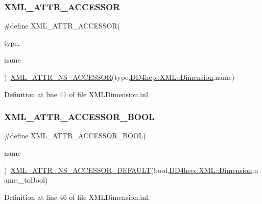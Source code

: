 \subsubsection{\texorpdfstring{X\+M\+L\+\_\+\+A\+T\+T\+R\+\_\+\+A\+C\+C\+E\+S\+S\+OR}{XML\_ATTR\_ACCESSOR}}
{\footnotesize\ttfamily \#define X\+M\+L\+\_\+\+A\+T\+T\+R\+\_\+\+A\+C\+C\+E\+S\+S\+OR(\begin{DoxyParamCaption}\item[{}]{type,  }\item[{}]{name }\end{DoxyParamCaption})~\hyperlink{_x_m_l_dimension_8inl_a712f343791889ac7912b917b64ccb32a}{X\+M\+L\+\_\+\+A\+T\+T\+R\+\_\+\+N\+S\+\_\+\+A\+C\+C\+E\+S\+S\+OR}(type,\hyperlink{struct_d_d4hep_1_1_x_m_l_1_1_dimension}{D\+D4hep\+::\+X\+M\+L\+::\+Dimension},name)}



Definition at line 41 of file X\+M\+L\+Dimension.\+inl.

\hypertarget{_x_m_l_dimension_8inl_a8efa1be16815f59e7b049cab22c08a21}{}\label{_x_m_l_dimension_8inl_a8efa1be16815f59e7b049cab22c08a21} 
\subsubsection{\texorpdfstring{X\+M\+L\+\_\+\+A\+T\+T\+R\+\_\+\+A\+C\+C\+E\+S\+S\+O\+R\+\_\+\+B\+O\+OL}{XML\_ATTR\_ACCESSOR\_BOOL}}
{\footnotesize\ttfamily \#define X\+M\+L\+\_\+\+A\+T\+T\+R\+\_\+\+A\+C\+C\+E\+S\+S\+O\+R\+\_\+\+B\+O\+OL(\begin{DoxyParamCaption}\item[{}]{name }\end{DoxyParamCaption})~\hyperlink{_x_m_l_dimension_8inl_a621d9cfc07f37e663ecb8f6c5bd22dfa}{X\+M\+L\+\_\+\+A\+T\+T\+R\+\_\+\+N\+S\+\_\+\+A\+C\+C\+E\+S\+S\+O\+R\+\_\+\+D\+E\+F\+A\+U\+LT}(bool,\hyperlink{struct_d_d4hep_1_1_x_m_l_1_1_dimension}{D\+D4hep\+::\+X\+M\+L\+::\+Dimension},name,\+\_\+to\+Bool)}



Definition at line 46 of file X\+M\+L\+Dimension.\+inl.


